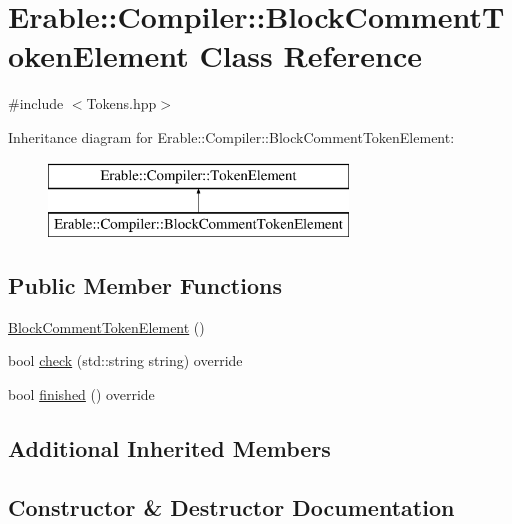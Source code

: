 \hypertarget{class_erable_1_1_compiler_1_1_block_comment_token_element}{}\section{Erable\+::Compiler\+::Block\+Comment\+Token\+Element Class Reference}
\label{class_erable_1_1_compiler_1_1_block_comment_token_element}


{\ttfamily \#include $<$Tokens.\+hpp$>$}

Inheritance diagram for Erable\+::Compiler\+::Block\+Comment\+Token\+Element\+:\begin{figure}[H]
\begin{center}
\leavevmode
\includegraphics[height=2.000000cm]{class_erable_1_1_compiler_1_1_block_comment_token_element}
\end{center}
\end{figure}
\subsection*{Public Member Functions}
\begin{DoxyCompactItemize}
\item 
\mbox{\hyperlink{class_erable_1_1_compiler_1_1_block_comment_token_element_a3b7d4dc2b1608d3286aa8da479bbc42c}{Block\+Comment\+Token\+Element}} ()
\item 
bool \mbox{\hyperlink{class_erable_1_1_compiler_1_1_block_comment_token_element_ac659ec24cb21bae5b4985f8d9c23d2cb}{check}} (std\+::string string) override
\item 
bool \mbox{\hyperlink{class_erable_1_1_compiler_1_1_block_comment_token_element_ad212efa213376be9172cf48674041c6f}{finished}} () override
\end{DoxyCompactItemize}
\subsection*{Additional Inherited Members}


\subsection{Constructor \& Destructor Documentation}
\mbox{\label{class_erable_1_1_compiler_1_1_block_comment_token_element_a3b7d4dc2b1608d3286aa8da479bbc42c}} 
